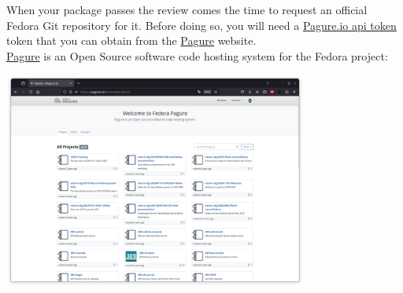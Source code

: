 When your package passes the review comes the time to request an official Fedora Git repository for it. 
Before doing so, you will need a \href{https://pagure.io/settings/token/new}{Pagure.io api token} token that you can obtain from the \href{https://pagure.io/}{Pagure} website. \\ 
\href{https://pagure.io/}{Pagure} is an Open Source software code hosting system for the Fedora project: 
\begin{center}
\includegraphics[width=0.75\textwidth,keepaspectratio=true,draft=\ddst]{img/rpms/pagure/pagure-0.eps}
\end{center}
